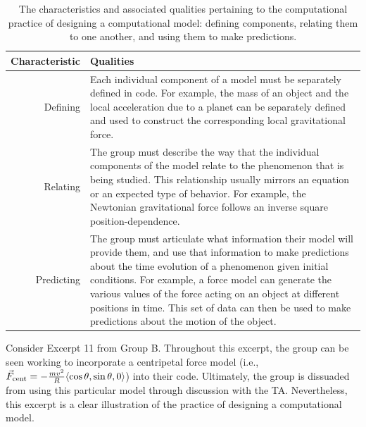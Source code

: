 \documentclass{msuphddissertation}
\begin{document}
\begin{doublespace}
\begin{table}
\begin{tabular}{r|p{}}
Characteristic & Qualities \\\hline\hline
Defining & Each individual component of a model must be separately defined in code.  For example, the mass of an object and the local acceleration due to a planet can be separately defined and used to construct the corresponding local gravitational force.\\
Relating & The group must describe the way that the individual components of the model relate to the phenomenon that is being studied.  This relationship usually mirrors an equation or an expected type of behavior.  For example, the Newtonian gravitational force follows an inverse square position-dependence.\\
Predicting & The group must articulate what information their model will provide them, and use that information to make predictions about the time evolution of a phenomenon given initial conditions.  For example, a force model can generate the various values of the force acting on an object at different positions in time.  This set of data can then be used to make predictions about the motion of the object.\\
\end{tabular}\caption{The characteristics and associated qualities pertaining to the computational practice of designing a computational model: defining components, relating them to one another, and using them to make predictions.}\label{CH5:DesigningModels}
\end{table}

Consider Excerpt 11 from Group B.  Throughout this excerpt, the group can be seen working to incorporate a centripetal force model (i.e., $\vec{F}_{\rm cent}=-\frac{mv^{2}}{R}\langle\cos\theta,\sin\theta,0\rangle$) into their code.  Ultimately, the group is dissuaded from using this particular model through discussion with the TA.  Nevertheless, this excerpt is a clear illustration of the practice of designing a computational model.


\end{doublespace}
\end{document}
